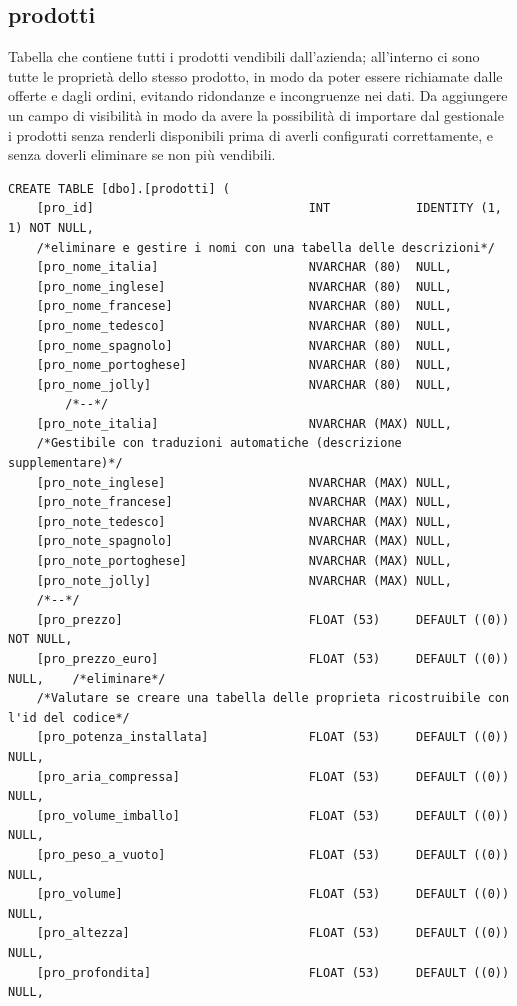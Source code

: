 \documentclass[12pt]{article}
\begin{document}
\subsection{prodotti}
Tabella che contiene tutti i prodotti vendibili dall'azienda; all'interno ci sono tutte le proprietà dello stesso prodotto,
in modo da poter essere richiamate dalle offerte e dagli ordini, evitando ridondanze e incongruenze nei dati.
Da aggiungere un campo di visibilità in modo da avere la possibilità di importare dal gestionale i prodotti
senza renderli disponibili prima di averli configurati correttamente, e senza doverli eliminare se non più vendibili.
\begin{lstlisting}
CREATE TABLE [dbo].[prodotti] (
    [pro_id]                              INT            IDENTITY (1, 1) NOT NULL,
    /*eliminare e gestire i nomi con una tabella delle descrizioni*/
    [pro_nome_italia]                     NVARCHAR (80)  NULL,
    [pro_nome_inglese]                    NVARCHAR (80)  NULL,
    [pro_nome_francese]                   NVARCHAR (80)  NULL,
    [pro_nome_tedesco]                    NVARCHAR (80)  NULL,
    [pro_nome_spagnolo]                   NVARCHAR (80)  NULL,
    [pro_nome_portoghese]                 NVARCHAR (80)  NULL,
    [pro_nome_jolly]                      NVARCHAR (80)  NULL,
        /*--*/
    [pro_note_italia]                     NVARCHAR (MAX) NULL,
    /*Gestibile con traduzioni automatiche (descrizione supplementare)*/
    [pro_note_inglese]                    NVARCHAR (MAX) NULL,
    [pro_note_francese]                   NVARCHAR (MAX) NULL,
    [pro_note_tedesco]                    NVARCHAR (MAX) NULL,
    [pro_note_spagnolo]                   NVARCHAR (MAX) NULL,
    [pro_note_portoghese]                 NVARCHAR (MAX) NULL,
    [pro_note_jolly]                      NVARCHAR (MAX) NULL,
    /*--*/
    [pro_prezzo]                          FLOAT (53)     DEFAULT ((0)) NOT NULL,
    [pro_prezzo_euro]                     FLOAT (53)     DEFAULT ((0)) NULL,    /*eliminare*/
    /*Valutare se creare una tabella delle proprieta ricostruibile con l'id del codice*/
    [pro_potenza_installata]              FLOAT (53)     DEFAULT ((0)) NULL,
    [pro_aria_compressa]                  FLOAT (53)     DEFAULT ((0)) NULL,
    [pro_volume_imballo]                  FLOAT (53)     DEFAULT ((0)) NULL,
    [pro_peso_a_vuoto]                    FLOAT (53)     DEFAULT ((0)) NULL,
    [pro_volume]                          FLOAT (53)     DEFAULT ((0)) NULL,
    [pro_altezza]                         FLOAT (53)     DEFAULT ((0)) NULL,
    [pro_profondita]                      FLOAT (53)     DEFAULT ((0)) NULL,

\end{lstlisting}
\end{document}
